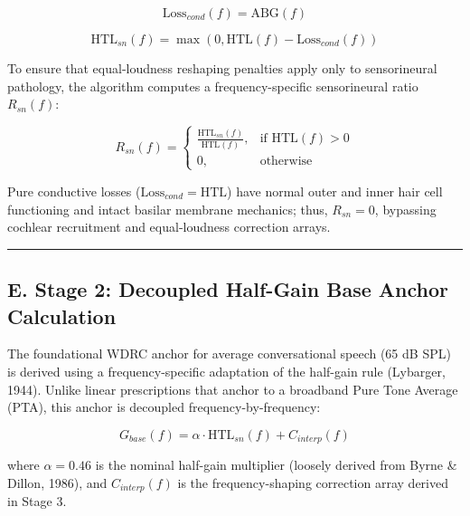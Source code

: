 \documentclass[
]{article}
\begin{document}
\begin{equation}
\text{Loss}_{cond}(f) = \text{ABG}(f)
\end{equation}

\begin{equation}
\text{HTL}_{sn}(f) = \max\left(0, \text{HTL}(f) - \text{Loss}_{cond}(f)\right)
\end{equation}

To ensure that equal-loudness reshaping penalties apply only to
sensorineural pathology, the algorithm computes a frequency-specific
sensorineural ratio \(R_{sn}(f)\):

\begin{equation}
R_{sn}(f) = \begin{cases} 
\frac{\text{HTL}_{sn}(f)}{\text{HTL}(f)}, & \text{if } \text{HTL}(f) > 0 \\ 
0, & \text{otherwise} 
\end{cases}
\end{equation}

Pure conductive losses (\(\text{Loss}_{cond} = \text{HTL}\)) have normal
outer and inner hair cell functioning and intact basilar membrane
mechanics; thus, \(R_{sn} = 0\), bypassing cochlear recruitment and
equal-loudness correction arrays.

\begin{center}\rule{0.5\linewidth}{0.5pt}\end{center}

\subsection{E. Stage 2: Decoupled Half-Gain Base Anchor
Calculation}\label{e.-stage-2-decoupled-half-gain-base-anchor-calculation}

The foundational WDRC anchor for average conversational speech (65 dB
SPL) is derived using a frequency-specific adaptation of the half-gain
rule (Lybarger, 1944). Unlike linear prescriptions that anchor to a
broadband Pure Tone Average (PTA), this anchor is decoupled
frequency-by-frequency:

\begin{equation}
G_{base}(f) = \alpha \cdot \text{HTL}_{sn}(f) + C_{interp}(f)
\end{equation}

where \(\alpha = 0.46\) is the nominal half-gain multiplier (loosely
derived from Byrne \& Dillon, 1986), and \(C_{interp}(f)\) is the
frequency-shaping correction array derived in Stage 3.
\end{document}
